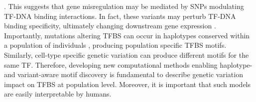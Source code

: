\documentclass[a4paper, titlepage, openright]{book}
\begin{document}
\citep{maurano2012systematic}. This suggests that gene misregulation may be mediated by SNPs modulating TF-DNA binding interactions. In fact, these variants may perturb TF-DNA binding specificity, ultimately changing downstream gene expression \citep{deplancke2016genetics}. Importantly, mutations altering TFBS can occur in haplotypes conserved within a population of individuals \citep{kasowski2010variation}, producing population specific TFBS motifs. Similarly, cell-type specific genetic variation can produce different motifs for the same TF. Therefore, developing new computational methods enabling haplotype- and variant-aware motif discovery is fundamental to describe genetic variation impact on TFBS at population level. Moreover, it is important that such models are easily interpretable by humans.




\end{document}
